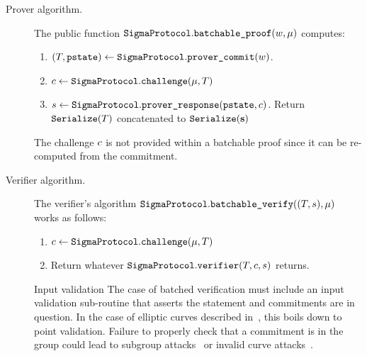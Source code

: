 \documentclass[11pt]{article}
\begin{document}
\begin{description}
\item[Prover algorithm.]
The public function $\texttt{SigmaProtocol}.\texttt{batchable\_proof}( w, \mu)$ computes:
\begin{enumerate}
\item
   $(T,\texttt{pstate})\gets\texttt{SigmaProtocol}.\texttt{prover\_commit}( w)$.
\item
$c \gets \texttt{SigmaProtocol}.\texttt{challenge}(\mu,T)$
\item
   $s\gets\texttt{SigmaProtocol}.\texttt{prover\_response}(\texttt{pstate},  c)$.
  Return $\texttt{Serialize}(T)$ concatenated to $\texttt{Serialize}(\mathbf {s})$
\end{enumerate}
The challenge $c$ is not provided within a batchable proof since it can be re-computed from the commitment.
\item[Verifier algorithm.] The verifier's algorithm $\texttt{SigmaProtocol}.\texttt{batchable\_verify}((T,s), \mu)$ works as follows:
\begin{enumerate}
  \item
    $c \gets \texttt{SigmaProtocol}.\texttt{challenge}(\mu, T)$
  \item
    Return whatever $\texttt{SigmaProtocol}.\texttt{verifier}(T,c, s)$ returns.
\end{enumerate}
\begin{warning}{Input validation}{}
The case of batched verification must include an input validation sub-routine that asserts the statement and commitments are in question.
In the case of elliptic curves described in~, this boils down to point validation.
Failure to properly check that a commitment is in the group could lead to subgroup attacks~\cite{EC:VanWie96,C:LimLee97} or invalid curve attacks~\cite{C:BieMeyMul00,RSA:BBPV12}.

\end{warning}
\end{description}
\end{document}
